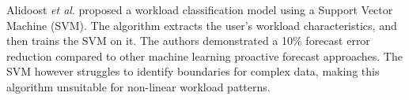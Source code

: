 Alidoost \textit{et al}. \cite{alidoost2023introducing} proposed a workload classification model using a Support Vector Machine (SVM). The algorithm extracts the user's workload characteristics, and then trains the SVM on it. The authors demonstrated a 10\% forecast error reduction compared to other machine learning proactive forecast approaches. The SVM however struggles to identify boundaries for complex data, making this algorithm unsuitable for non-linear workload patterns.\par

\begin{comment}
\begin{longtable}{|m{2em} | m{5em} | m{4em} | m{10em} | m{11em}|}
\caption{Summary of proactive auto-scaling solutions}\label{tab:proactive-autoscalers}
\hline
Ref & Technique & Scaling Metrics & Contributions & Limitations\\
\hline
\cite{ju2021proactive} & User-defined models & User-defined metrics & Fully customizable architecture with user-defined metrics and prediction model & Complex hyper-parameter tuning, lack of initial training data causes erroneous predictions\\
\hline
\cite{imdoukh2020machine} & LSTM & HTTP requests & Proactive autoscaler for edge architectures using an LSTM model & Initial lack of training data leads to erroneous predictions\\
\hline
\cite{messias2016combining} & GA & Response time & Genetic algorithm based proactive autoscaler with no training phase & High rate of initial errors due to GA randomness\\
\hline
\cite{abdullah2020burst} & XGBoost & CPU & Autoscaler capable of burst detection & Incapable of capturing several other workload patterns\\
\hline
\cite{alidoost2023introducing} & SVM & CPU & SVM based workload prediction model & Difficulty in identifying non-linear workload patterns\\
\hline
\end{longtable}
\end{comment}

